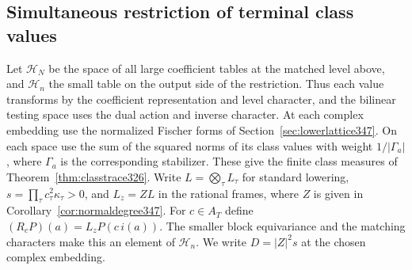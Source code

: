 \documentclass[a4paper,11pt]{article}
\theoremstyle{definition}
\theoremstyle{remark}
\numberwithin{equation}{section}
\begin{document}
\subsection{Simultaneous restriction of terminal class values}\label{sec:allclasses350}

Let \(\mathcal H_N\) be the space of all large coefficient tables
at the matched level above, and \(\mathcal H_n\) the small table on
the output side of the restriction. Thus each value transforms by
the coefficient representation and level character, and the
bilinear testing space uses the dual action and inverse character.
At each complex embedding use the normalized Fischer forms of
Section~\ref{sec:lowerlattice347}. On each space use the sum of
the squared norms of its class values with weight \(1/|\Gamma_a|\),
where \(\Gamma_a\) is the corresponding stabilizer.
These give the finite class measures of Theorem~\ref{thm:classtrace326}.
Write \(L=\bigotimes_\tau L_\tau\) for standard lowering,
\(s=\prod_\tau c_\tau^2\kappa_\tau>0\), and \(L_z=ZL\) in the
rational frames, where \(Z\) is given in Corollary~\ref{cor:normaldegree347}.
For \(c\in A_T\) define \((R_cP)(a)=L_z P(c\,i(a))\).
The smaller block equivariance and the matching characters make this
an element of \(\mathcal H_n\). We write \(D=|Z|^2s\) at the
chosen complex embedding.
\end{document}
